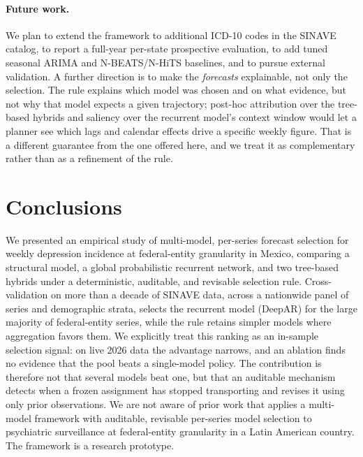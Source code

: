\documentclass[runningheads]{llncs}
\begin{document}
\paragraph{Future work.}
We plan to extend the framework to additional \mbox{ICD-10} codes in the
SINAVE catalog, to report a full-year per-state prospective evaluation,
to add tuned seasonal ARIMA and N-BEATS/N-HiTS baselines, and to
pursue external validation. A further direction is to make the
\emph{forecasts} explainable, not only the selection. The rule explains
which model was chosen and on what evidence, but not why that model
expects a given trajectory; post-hoc attribution over the tree-based
hybrids and saliency over the recurrent model's context window would let
a planner see which lags and calendar effects drive a specific weekly
figure. That is a different guarantee from the one offered here, and we
treat it as complementary rather than as a refinement of the rule.

\section{Conclusions}
\label{sec:conclusions}

We presented an empirical study of multi-model, per-series forecast
selection for weekly depression incidence at federal-entity
granularity in Mexico, comparing a structural model, a global
probabilistic recurrent network, and two tree-based hybrids under a
deterministic, auditable, and revisable selection rule. Cross-validation on more than a decade of SINAVE data, across a
nationwide panel of series and demographic strata, selects the
recurrent model (DeepAR) for the large majority of federal-entity
series, while the rule retains simpler models where aggregation
favors them. We
explicitly treat this ranking as an in-sample selection signal: on live
2026 data the advantage narrows, and an ablation finds no evidence that
the pool beats a single-model policy. The contribution is therefore not
that several models beat one, but that an auditable mechanism detects
when a frozen assignment has stopped transporting and revises it using
only prior observations. We are not aware of prior
work that applies a multi-model framework with auditable, revisable
per-series model selection to psychiatric surveillance at
federal-entity granularity in a Latin American country. The framework is a research prototype.
\end{document}
